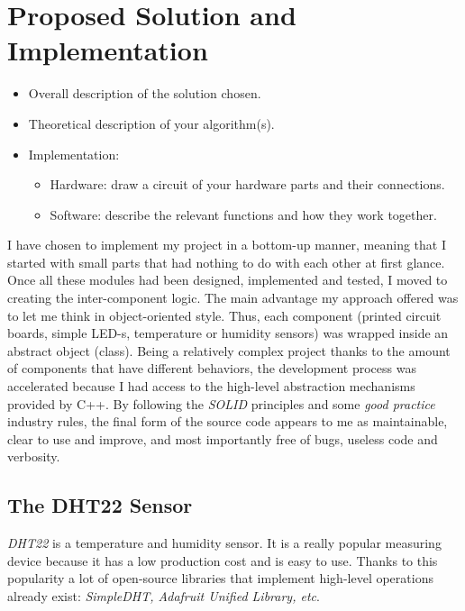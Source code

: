 \documentclass[12pt]{article}
\begin{document}
	\clearpage
	
	\section{Proposed Solution and Implementation}
	\begin{itemize}
		\item Overall description of the solution chosen.
		\item Theoretical description of your algorithm(s).
		\item Implementation:
		\begin{itemize}
			\item Hardware: draw a circuit of your hardware parts and their connections.
			\item Software: describe the relevant functions and how they work together. 
		\end{itemize}
	\end{itemize}
	
	I have chosen to implement my project in a bottom-up manner, meaning that I started with small parts that had nothing to do with each other at first glance. Once all these modules had been designed, implemented and tested, I moved to creating the inter-component logic. The main advantage my approach offered was to let me think in object-oriented style. Thus, each component (printed circuit boards, simple LED-s, temperature or humidity sensors) was wrapped inside an abstract object (class). Being a relatively complex project thanks to the amount of components that have different behaviors, the development process was accelerated because I had access to the high-level abstraction mechanisms provided by C++. By following the \textit{SOLID} principles and some \textit{good practice} industry rules, the final form of the source code appears to me as maintainable, clear to use and improve, and most importantly free of bugs, useless code and verbosity.
	
	\subsection{The DHT22 Sensor}
	
	\textit{DHT22} is a temperature and humidity sensor. It is a really popular measuring device because it has a low production cost and is easy to use. Thanks to this popularity a lot of open-source libraries that implement high-level operations already exist: \textit{SimpleDHT, Adafruit Unified Library, etc}.
	
\end{document}
